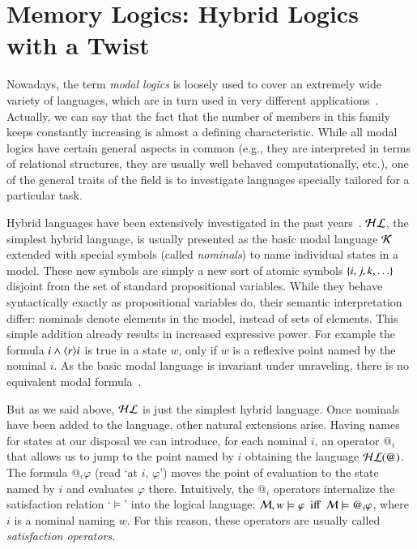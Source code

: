 \section{Memory Logics: Hybrid Logics with a Twist}\label{twist}

Nowadays, the term \emph{modal logics} is loosely used to cover
an extremely wide variety of languages, which are in turn used
in very different applications~\cite{BRV01,handbook}.  Actually,
we can say that the fact
that the number of members in this family keeps constantly increasing
is almost a defining characteristic.  While all modal logics have
certain general aspects in common (e.g., they are interpreted in
terms of relational structures, they are usually well behaved
computationally, etc.), one of the general traits of the field is
to investigate languages specially tailored for a particular task.


Hybrid languages have been extensively investigated in the past
years~\cite{handbookarticle}. $\mathcal{HL}$, the simplest hybrid language, is usually presented as
the basic modal language $\mathcal{K}$ extended with special symbols (called
\emph{nominals}) to name individual states in a model. These new
symbols are simply a new sort of atomic symbols
$\{i,j,k,\ldots\}$ disjoint from the set of standard
propositional variables. While they behave syntactically exactly as
propositional variables do, their semantic interpretation differ:
nominals denote elements in the model, instead of sets of elements.
This simple addition already results in increased expressive power.
For example the formula $i \wedge \langle r \rangle i$ is true in a state $w$,
only if $w$ is a reflexive point named by the nominal $i$. As the
basic modal language is invariant under unraveling, there is no
equivalent modal formula~\cite{BRV01}.

But as we said above, $\mathcal{HL}$ is just the simplest hybrid language.
Once nominals have been added to the language, other natural
extensions arise.  Having names for states at our disposal we can
introduce, for each nominal $i$, an operator $@_i$ that allows us to
jump to the point named by $i$ obtaining the language $\mathcal{HL}(@)$. The
formula $@_i\varphi$ (read `at $i$, $\varphi$') moves the point of
evaluation to the state named by $i$ and evaluates $\varphi$ there.
Intuitively, the $@_i$ operators internalize the satisfaction
relation `$\models$' into the logical language: $\mathcal{M}, w \models
\varphi \mbox{ ~iff~ } \mathcal{M} \models @_i\varphi$, where $i$ is a
nominal naming $w$. For this reason, these operators are usually
called \emph{satisfaction operators}.

